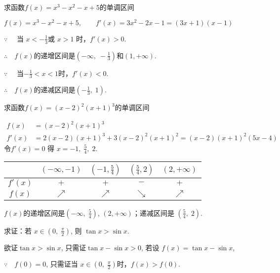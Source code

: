 \begin{example}
    求函数$f(x)=x^3-x^2-x+5$的单调区间
\end{example}

\begin{solution}
$f(x)=x^3-x^2-x+5,\qquad f'\left(x\right)=3x^{2}-2x-1=\left(3x+1\right)\left(x-1\right)$

$\because\quad $ 当 $x<-\frac13$或 $x>1$ 时，$f'(x)>0$.

$\therefore\quad f( x)$的递增区间是$\left(-\infty,\; -\frac13\right)$和$(1,+\infty)$.

$\because\quad $ 当$-\frac13<x<1$时，$f'(x)<0$. 

$\therefore\quad f( x)$的递减区间是$\left(-\frac13,\; 1\right).$
\end{solution}

\begin{example}
    求函数$f(x)=(x-2)^2(x+1)^3$的单调区间
\end{example}

\begin{solution}
\[\begin{split}
    f(x)&=(x-2)^2(x+1)^3\\
f'(x)&=2(x-2)(x+1)^{3}+3(x-2)^{2}(x+1)^{2}=(x-2)(x+1)^{2}(5x-4)
\end{split}\]
令$f'( x) = 0$ 得 $x= - 1,\; \frac 54,\; 2$.
\begin{center}
    \begin{tabular}{c|cccc}
\hline
& $(-\infty,-1)$ & $\left(-1,\frac{5}{4}\right)$ & $\left(\frac{5}{4},2\right)$ & $(2,+\infty)$ \\ 
\hline
$f'(x)$&  $+$&  $+$&  $-$&  $+$\\
$f(x)$ & $\nearrow$& $\nearrow$& $\searrow$& $\nearrow$\\
\hline
    \end{tabular}
\end{center}

$f(x)$的递增区间是$\left(-\infty,\; \frac{5}{4}\right)$, $(2,+\infty)$；递减区间是
$\left(\frac{5}{4},\; 2\right).$
\end{solution}

\begin{example}
    求证：若 $x\in\left(0,\; \frac\pi2\right)$, 则 $\tan x>\sin x$.
\end{example}

\begin{analyze}
    欲证$\tan x>\sin x$, 只需证$\tan x-\sin x>0$, 若设 $f(x) =\tan x-\sin x$,
    
$\because\quad  f(0)=0$, 只需证当 $x\in\left(0,\; \frac\pi2\right)$时，$f(x)>f(0)$.
\end{analyze}

